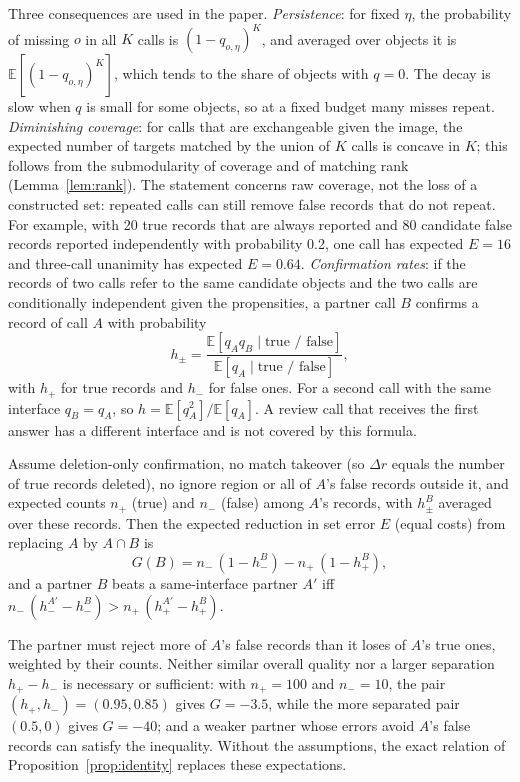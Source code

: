 Three consequences are used in the paper.
\emph{Persistence}: for fixed $\eta$, the probability of missing $o$ in all $K$ calls is $(1-q_{o,\eta})^K$, and averaged over objects it is $\mathbb{E}[(1-q_{o,\eta})^K]$, which tends to the share of objects with $q=0$. The decay is slow when $q$ is small for some objects, so at a fixed budget many misses repeat.
\emph{Diminishing coverage}: for calls that are exchangeable given the image, the expected number of targets matched by the union of $K$ calls is concave in $K$; this follows from the submodularity of coverage \citep{nemhauser1978submodular} and of matching rank (Lemma~\ref{lem:rank}). The statement concerns raw coverage, not the loss of a constructed set: repeated calls can still remove false records that do not repeat. For example, with 20 true records that are always reported and 80 candidate false records reported independently with probability 0.2, one call has expected $E=16$ and three-call unanimity has expected $E=0.64$.
\emph{Confirmation rates}: if the records of two calls refer to the same candidate objects and the two calls are conditionally independent given the propensities, a partner call $B$ confirms a record of call $A$ with probability
\[
h_\pm=\frac{\mathbb{E}[q_Aq_B\mid\text{true / false}]}{\mathbb{E}[q_A\mid\text{true / false}]},
\]
with $h_+$ for true records and $h_-$ for false ones. For a second call with the same interface $q_B=q_A$, so $h=\mathbb{E}[q_A^2]/\mathbb{E}[q_A]$. A review call that receives the first answer has a different interface and is not covered by this formula.

\begin{proposition}\label{prop:partner}
Assume deletion-only confirmation, no match takeover (so $\Delta r$ equals the number of true records deleted), no ignore region or all of $A$'s false records outside it, and expected counts $n_+$ (true) and $n_-$ (false) among $A$'s records, with $h^B_\pm$ averaged over these records. Then the expected reduction in set error $E$ (equal costs) from replacing $A$ by $A\cap B$ is
\[
G(B)=n_-\,(1-h_-^B)-n_+\,(1-h_+^B),
\]
and a partner $B$ beats a same-interface partner $A'$ iff $n_-\,(h_-^{A'}-h_-^{B})>n_+\,(h_+^{A'}-h_+^{B})$.
\end{proposition}
The partner must reject more of $A$'s false records than it loses of $A$'s true ones, weighted by their counts. Neither similar overall quality nor a larger separation $h_+-h_-$ is necessary or sufficient: with $n_+=100$ and $n_-=10$, the pair $(h_+,h_-)=(0.95,0.85)$ gives $G=-3.5$, while the more separated pair $(0.5,0)$ gives $G=-40$; and a weaker partner whose errors avoid $A$'s false records can satisfy the inequality. Without the assumptions, the exact relation of Proposition~\ref{prop:identity} replaces these expectations.

